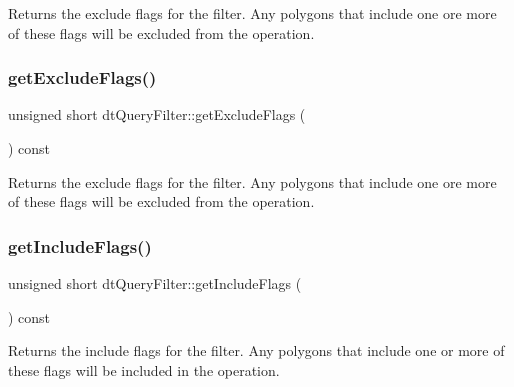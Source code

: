 Returns the exclude flags for the filter. Any polygons that include one ore more of these flags will be excluded from the operation. \mbox{\label{classdtQueryFilter_ac3e2d16755c3510003f0580e27ce4897}} 
\subsubsection{\texorpdfstring{get\+Exclude\+Flags()}{getExcludeFlags()}\hspace{0.1cm}{\footnotesize\ttfamily [2/2]}}
{\footnotesize\ttfamily unsigned short dt\+Query\+Filter\+::get\+Exclude\+Flags (\begin{DoxyParamCaption}{ }\end{DoxyParamCaption}) const\hspace{0.3cm}{\ttfamily [inline]}}

Returns the exclude flags for the filter. Any polygons that include one ore more of these flags will be excluded from the operation. \mbox{\label{classdtQueryFilter_a5bae688840167576dc6ab7913dda1b34}} 
\subsubsection{\texorpdfstring{get\+Include\+Flags()}{getIncludeFlags()}\hspace{0.1cm}{\footnotesize\ttfamily [1/2]}}
{\footnotesize\ttfamily unsigned short dt\+Query\+Filter\+::get\+Include\+Flags (\begin{DoxyParamCaption}{ }\end{DoxyParamCaption}) const\hspace{0.3cm}{\ttfamily [inline]}}

Returns the include flags for the filter. Any polygons that include one or more of these flags will be included in the operation. \mbox{\label{classdtQueryFilter_a5bae688840167576dc6ab7913dda1b34}} 

